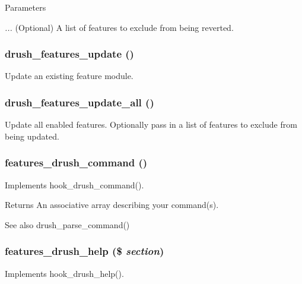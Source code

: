 \begin{DoxyParams}{Parameters}
\item[{\em ...}](Optional) A list of features to exclude from being reverted. \end{DoxyParams}
\hypertarget{features_8drush_8inc_ae2dbdf181a8cca17c4ef45646ceb0ea1}{
\subsubsection[{drush\_\-features\_\-update}]{\setlength{\rightskip}{0pt plus 5cm}drush\_\-features\_\-update ()}}
\label{features_8drush_8inc_ae2dbdf181a8cca17c4ef45646ceb0ea1}
Update an existing feature module. \hypertarget{features_8drush_8inc_a7d95941d91e834c1e3cee0ffa754ceec}{
\subsubsection[{drush\_\-features\_\-update\_\-all}]{\setlength{\rightskip}{0pt plus 5cm}drush\_\-features\_\-update\_\-all ()}}
\label{features_8drush_8inc_a7d95941d91e834c1e3cee0ffa754ceec}
Update all enabled features. Optionally pass in a list of features to exclude from being updated. \hypertarget{features_8drush_8inc_a00ed49df191e919ece900cc7aa8b8921}{
\subsubsection[{features\_\-drush\_\-command}]{\setlength{\rightskip}{0pt plus 5cm}features\_\-drush\_\-command ()}}
\label{features_8drush_8inc_a00ed49df191e919ece900cc7aa8b8921}
Implements hook\_\-drush\_\-command().

\begin{DoxyReturn}{Returns}
An associative array describing your command(s).
\end{DoxyReturn}
\begin{DoxySeeAlso}{See also}
drush\_\-parse\_\-command() 
\end{DoxySeeAlso}
\hypertarget{features_8drush_8inc_af50837dd8f14194568dffcfad0c38f9c}{
\subsubsection[{features\_\-drush\_\-help}]{\setlength{\rightskip}{0pt plus 5cm}features\_\-drush\_\-help (\$ {\em section})}}
\label{features_8drush_8inc_af50837dd8f14194568dffcfad0c38f9c}
Implements hook\_\-drush\_\-help(). 